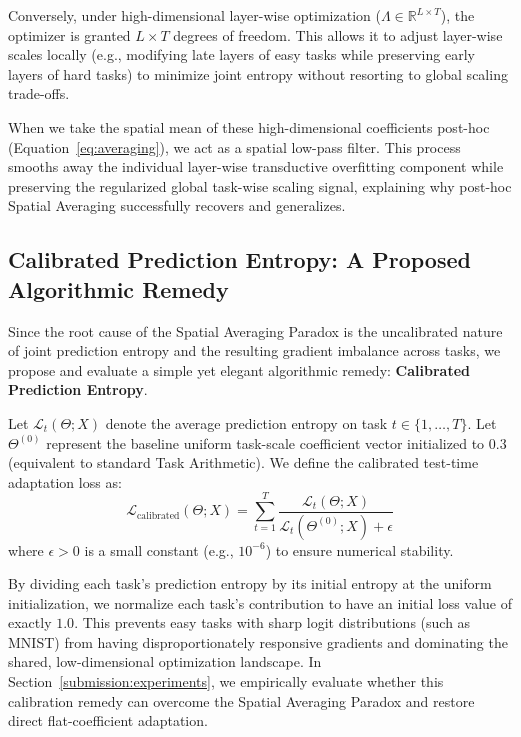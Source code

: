 Conversely, under high-dimensional layer-wise optimization ($\Lambda \in \mathbb{R}^{L \times T}$), the optimizer is granted $L \times T$ degrees of freedom. This allows it to adjust layer-wise scales locally (e.g., modifying late layers of easy tasks while preserving early layers of hard tasks) to minimize joint entropy without resorting to global scaling trade-offs. 

When we take the spatial mean of these high-dimensional coefficients post-hoc (Equation~\ref{eq:averaging}), we act as a spatial low-pass filter. This process smooths away the individual layer-wise transductive overfitting component while preserving the regularized global task-wise scaling signal, explaining why post-hoc Spatial Averaging successfully recovers and generalizes.

\subsection{Calibrated Prediction Entropy: A Proposed Algorithmic Remedy}
\label{sub:calibrated_remedy}
Since the root cause of the Spatial Averaging Paradox is the uncalibrated nature of joint prediction entropy and the resulting gradient imbalance across tasks, we propose and evaluate a simple yet elegant algorithmic remedy: \textbf{Calibrated Prediction Entropy}.

Let $\mathcal{L}_t(\Theta; X)$ denote the average prediction entropy on task $t \in \{1, \dots, T\}$. Let $\Theta^{(0)}$ represent the baseline uniform task-scale coefficient vector initialized to $0.3$ (equivalent to standard Task Arithmetic). We define the calibrated test-time adaptation loss as:
\begin{equation}
\mathcal{L}_{\text{calibrated}}(\Theta; X) = \sum_{t=1}^T \frac{\mathcal{L}_t\left(\Theta; X\right)}{\mathcal{L}_t\left(\Theta^{(0)}; X\right) + \epsilon}
\end{equation}
where $\epsilon > 0$ is a small constant (e.g., $10^{-6}$) to ensure numerical stability.

By dividing each task's prediction entropy by its initial entropy at the uniform initialization, we normalize each task's contribution to have an initial loss value of exactly $1.0$. This prevents easy tasks with sharp logit distributions (such as MNIST) from having disproportionately responsive gradients and dominating the shared, low-dimensional optimization landscape. In Section~\ref{submission:experiments}, we empirically evaluate whether this calibration remedy can overcome the Spatial Averaging Paradox and restore direct flat-coefficient adaptation.
